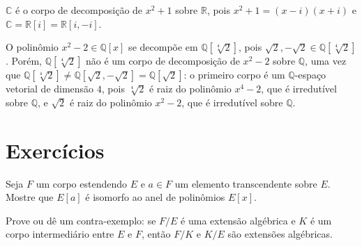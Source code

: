 \begin{exemplo}
$\mathbb C$ é o corpo de decomposição de $x^2+1$ sobre $\mathbb R$, pois $x^2+1=(x-i)(x+i)$ e  $\mathbb C=\mathbb R[i]=\mathbb R[i, -i]$.
\end{exemplo}

\begin{exemplo}
O polinômio $x^2-2\in \mathbb Q[x]$ se decompõe em $\mathbb Q[\sqrt[4] 2]$, pois $\sqrt 2, -\sqrt 2 \in \mathbb Q[\sqrt[4] 2]$.
Porém, $\mathbb Q[\sqrt[4] 2]$ não é um corpo de decomposição de $x^2-2$ sobre $\mathbb Q$, uma vez que $\mathbb Q[\sqrt[4] 2]\neq \mathbb Q[\sqrt 2, -\sqrt 2]=\mathbb Q[\sqrt 2]$: o primeiro corpo é um $\mathbb Q$-espaço vetorial de dimensão $4$, pois $\sqrt[4] 2$ é raiz do polinômio $x^4-2$, que é irredutível sobre $\mathbb Q$, e $\sqrt 2$ é raiz do polinômio $x^2-2$, que é irredutível sobre $\mathbb Q$.
\end{exemplo}
\section{Exercícios}
\begin{exer}
    Seja $F$ um corpo estendendo $E$ e $a \in F$ um elemento transcendente sobre $E$. Mostre que $E[a]$ é isomorfo ao anel de polinômios $E[x]$.
\end{exer}

\begin{exer}
    Prove ou dê um contra-exemplo: se $F/E$ é uma extensão algébrica e $K$ é um corpo intermediário entre $E$ e $F$, então $F/K$ e $K/E$ são extensões algébricas.
\end{exer}

